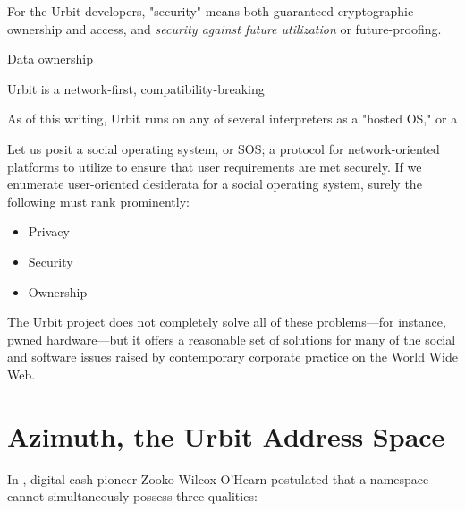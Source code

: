 For the Urbit developers, "security" means both guaranteed cryptographic ownership and access, and \emph{security against future utilization} or future-proofing.

Data ownership

Urbit is a  network-first,
compatibility-breaking

As of this writing, Urbit runs on any of several interpreters as a "hosted OS," or a


Let us posit a social operating system, or SOS;  a protocol for network-oriented platforms to utilize to ensure that user requirements are met securely.  If we enumerate user-oriented desiderata for a social operating system, surely the following must rank prominently:

\begin{itemize}
	\item  Privacy
	\item  Security
	\item  Ownership
\end{itemize}



The Urbit project does not completely solve all of these problems—for instance, pwned hardware—but it offers a reasonable set of solutions for many of the social and software issues raised by contemporary corporate practice on the World Wide Web.


\section{Azimuth, the Urbit Address Space}



In \citeyear{Zooko2001}, digital cash pioneer Zooko Wilcox-O'Hearn postulated that a namespace cannot simultaneously possess three qualities:

